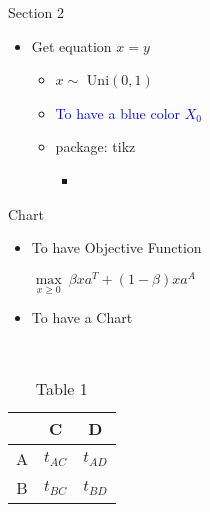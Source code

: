 \begin{frame}{Section 2}
    \begin{itemize}
        \item Get equation $x = y$
        \begin{itemize}
            \item $x \sim$ Uni$(0, 1)$
            \item \textcolor{blue}{To have a blue color $X_0$}
            \item package: tikz 
                \begin{itemize}
                    \item {}
                \end{itemize}
        \end{itemize}
    \end{itemize}
\end{frame}


\begin{frame}{Chart}
    \begin{itemize}
        \item To have Objective Function
        \begin{center}
            $\max\limits_{x \geq 0} \ \beta x a^T + (1 - \beta) x a^A$
        \end{center}
        \item To have a Chart
    \end{itemize}
      \\
    \begin{table}[!h]
        \begin{center}
            \begin{tabular}{ c|c|c } 
                    & C & D \\ 
             \hline
             A  & $t_{AC}$   & $t_{AD}$ \\ 
             \hline
             B  & $t_{BC}$   & $t_{BD}$ \\
            \end{tabular}
            \caption*{Table 1}
        \end{center}
    \end{table}
\end{frame}


